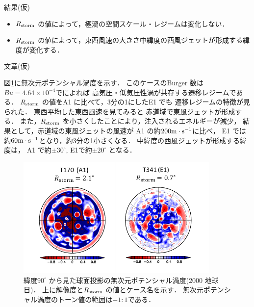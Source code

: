 \documentclass[a4j,12pt,openbib,oneside]{jreport}
\begin{document}
結果(仮)
\begin{itemize}
\item{$R_{\rm{storm}}$ の値によって，極渦の空間スケール・レジームは変化しない．}
\item{$R_{\rm{storm}}$ の値によって，東西風速の大きさ中緯度の西風ジェットが形成する緯度が変化する．}
\end{itemize}
%

文章(仮) 

図\ref{fig:case4_nonqv}に無次元ポテンシャル渦度を示す．
このケースのBurger 数は$Bu = 4.64\times 10^{-4}$で\cite{Brueshaber2019}によれば
高気圧・低気圧性渦が共存する遷移レジームである．
%
$R_{\rm{storm}}$ の値をA1 に比べて，3分の1にしたE1 でも
遷移レジームの特徴が見られた．
%
東西平均した東西風速を見てみると
赤道域で東風ジェットが形成する．
また，$R_{\rm{storm}}$ を小さくしたことにより，注入されるエネルギーが減少，
結果として，赤道域の東風ジェットの風速が
A1 の約$200 \rm{m\cdot s^{-1}}$に比べ，
E1 では約$60 \rm{m \cdot s^{-1}}$となり，約3分の1小さくなる．
%
中緯度の西風ジェットが形成する緯度は，
A1 で約$\pm 30^\circ$, E1で約$\pm 20^\circ$ となる．
%
\begin{figure}[ht]
  \begin{center}
    \includegraphics[clip,width=10cm]{./fig/result/case4/case4_nonqv.png}
    \caption{
      \footnotesize{緯度$90^\circ$ から見た球面投影の無次元ポテンシャル渦度(2000 地球日)．
上に解像度と$R_{\rm{storm}}$ の値とケース名を示す．
無次元ポテンシャル渦度のトーン値の範囲は$-1:1$である．
      }
    }
    \label{fig:case4_nonqv}
  \end{center}
\end{figure}
%
%
\end{document}
